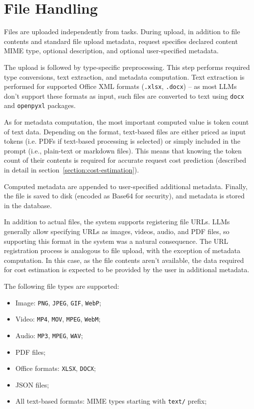 \documentclass[a4paper,11pt,twoside]{report}
\theoremstyle{definition}
\begin{document}
\section{File Handling}
\label{section:file-handling}

Files are uploaded independently from tasks. During upload, in addition to file contents and standard file upload metadata, request specifies declared content MIME type, optional description, and optional user-specified metadata.

The upload is followed by type-specific preprocessing. This step performs required type conversions, text extraction, and metadata computation. Text extraction is performed for supported Office XML formats (\texttt{.xlsx}, \texttt{.docx}) -- as most LLMs don't support these formats as input, such files are converted to text using \texttt{docx} and \texttt{openpyxl} packages. 

As for metadata computation, the most important computed value is token count of text data. Depending on the format, text-based files are either priced as input tokens (i.e. PDFs if text-based processing is selected) or simply included in the prompt (i.e., plain-text or markdown files). This means that knowing the token count of their contents is required for accurate request cost prediction (described in detail in section~\ref{section:cost-estimation}).

Computed metadata are appended to user-specified additional metadata. Finally, the file is saved to disk (encoded as Base64 for security), and metadata is stored in the database.

In addition to actual files, the system supports registering file URLs. LLMs generally allow specifying URLs as images, videos, audio, and PDF files, so supporting this format in the system was a natural consequence. The URL registration process is analogous to file upload, with the exception of metadata computation. In this case, as the file contents aren't available, the data required for cost estimation is expected to be provided by the user in additional metadata.

The following file types are supported:

\begin{itemize}
    \item Image: \texttt{PNG}, \texttt{JPEG}, \texttt{GIF}, \texttt{WebP};
    \item Video: \texttt{MP4}, \texttt{MOV}, \texttt{MPEG}, \texttt{WebM};
    \item Audio: \texttt{MP3}, \texttt{MPEG}, \texttt{WAV};
    \item PDF files;
    \item Office formats: \texttt{XLSX}, \texttt{DOCX};
    \item JSON files;
    \item All text-based formats: MIME types starting with \texttt{text/} prefix;
\end{itemize}
\end{document}
